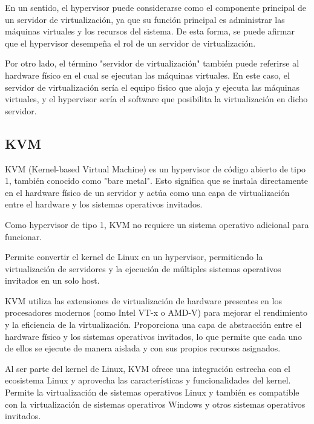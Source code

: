 			En un sentido, el hypervisor puede considerarse como el componente principal de un servidor de virtualización, ya que su función principal es administrar las máquinas virtuales y los recursos del sistema. De esta forma, se puede afirmar que el hypervisor desempeña el rol de un servidor de virtualización.\par
			
			Por otro lado, el término "servidor de virtualización" también puede referirse al hardware físico en el cual se ejecutan las máquinas virtuales. En este caso, el servidor de virtualización sería el equipo físico que aloja y ejecuta las máquinas virtuales, y el hypervisor sería el software que posibilita la virtualización en dicho servidor.\par

			
			
			\subsection{KVM}
		
				KVM (Kernel-based Virtual Machine) es un hypervisor de código abierto de tipo 1, también conocido como "bare metal". Esto 	significa que se instala directamente en el hardware físico de un servidor y actúa como una capa de virtualización entre el hardware y los sistemas operativos invitados.\par
		
				Como hypervisor de tipo 1, KVM no requiere un sistema operativo adicional para funcionar.\par
		
				Permite convertir el kernel de Linux en un hypervisor, permitiendo la virtualización de servidores y la ejecución de múltiples sistemas operativos invitados en un solo host.\par
		
				KVM utiliza las extensiones de virtualización de hardware presentes en los procesadores modernos (como Intel VT-x o AMD-V) para mejorar el rendimiento y la eficiencia de la virtualización. Proporciona una capa de abstracción entre el hardware físico y los sistemas operativos invitados, lo que permite que cada uno de ellos se ejecute de manera aislada y con sus propios recursos asignados.\par
		
				Al ser parte del kernel de Linux, KVM ofrece una integración estrecha con el ecosistema Linux y aprovecha las características y funcionalidades del kernel. Permite la virtualización de sistemas operativos Linux y también es compatible con la virtualización de sistemas operativos Windows y otros sistemas operativos invitados.\par
		
